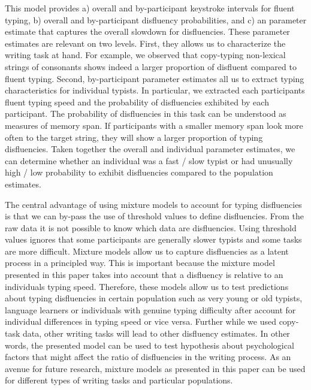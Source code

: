 \documentclass[english,jou,floatsintext]{apa7}
\begin{document}
This model provides a) overall and by-participant keystroke intervals for fluent typing, b) overall and by-participant disfluency probabilities, and c) an parameter estimate that captures the overall slowdown for disfluencies. These parameter estimates are relevant on two levels. First, they allows us to characterize the writing task at hand. For example, we observed that copy-typing non-lexical strings of consonants shows indeed a larger proportion of disfluent compared to fluent typing. Second, by-participant parameter estimates all us to extract typing characteristics for individual typists. In particular, we extracted each participants fluent typing speed and the probability of disfluencies exhibited by each participant. The probability of disfluencies in this task can be understood as measures of memory span. If participants with a smaller memory span look more often to the target string, they will show a larger proportion of typing disfluencies. Taken together the overall and individual parameter estimates, we can determine whether an individual was a fast / slow typist or had unusually high / low probability to exhibit disfluencies compared to the population estimates.

The central advantage of using mixture models to account for typing disfluencies is that we can by-pass the use of threshold values to define disfluencies. From the raw data it is not possible to know which data are disfluencies. Using threshold values ignores that some participants are generally slower typists and some tasks are more difficult. Mixture models allow us to capture disfluencies as a latent process in a principled way. This is important because the mixture model presented in this paper takes into account that a disfluency is relative to an individuals typing speed. Therefore, these models allow us to test predictions about typing disfluencies in certain population such as very young or old typists, language learners or individuals with genuine typing difficulty after account for individual differences in typing speed or vice versa. Further while we used copy-task data, other writing tasks will lead to other disfluency estimates. In other words, the presented model can be used to test hypothesis about psychological factors that might affect the ratio of disfluencies in the writing process. As an avenue for future research, mixture models as presented in this paper can be used for different types of writing tasks and particular populations.
\end{document}
